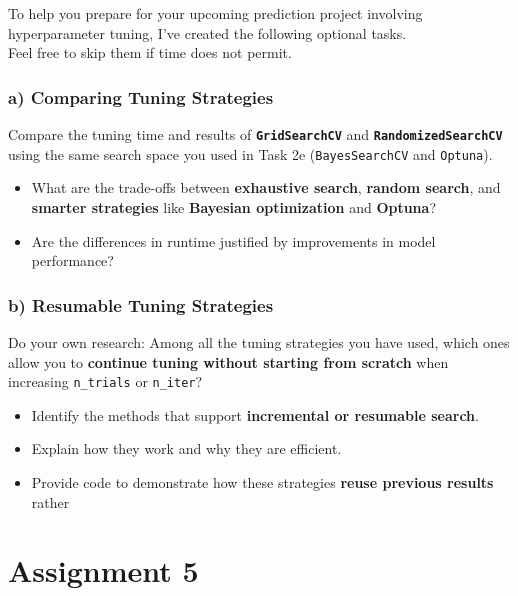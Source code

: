 \documentclass[
  letterpaper,
  DIV=11,
  numbers=noendperiod]{scrreprt}
\providecommand{\tightlist}{%
  \setlength{\itemsep}{0pt}\setlength{\parskip}{0pt}}\usepackage{longtable,booktabs,array}
\begin{document}
To help you prepare for your upcoming prediction project involving
hyperparameter tuning, I've created the following optional tasks.\\
Feel free to skip them if time does not permit.

\subsection{a) Comparing Tuning
Strategies}\label{a-comparing-tuning-strategies}

Compare the tuning time and results of \textbf{\texttt{GridSearchCV}}
and \textbf{\texttt{RandomizedSearchCV}} using the same search space you
used in Task 2e (\texttt{BayesSearchCV} and \texttt{Optuna}).

\begin{itemize}
\tightlist
\item
  What are the trade-offs between \textbf{exhaustive search},
  \textbf{random search}, and \textbf{smarter strategies} like
  \textbf{Bayesian optimization} and \textbf{Optuna}?
\item
  Are the differences in runtime justified by improvements in model
  performance?
\end{itemize}

\subsection{b) Resumable Tuning
Strategies}\label{b-resumable-tuning-strategies}

Do your own research: Among all the tuning strategies you have used,
which ones allow you to \textbf{continue tuning without starting from
scratch} when increasing \texttt{n\_trials} or \texttt{n\_iter}?

\begin{itemize}
\tightlist
\item
  Identify the methods that support \textbf{incremental or resumable
  search}.
\item
  Explain how they work and why they are efficient.
\item
  Provide code to demonstrate how these strategies \textbf{reuse
  previous results} rather
\end{itemize}

\chapter{Assignment 5}\label{assignment-5}
\end{document}
